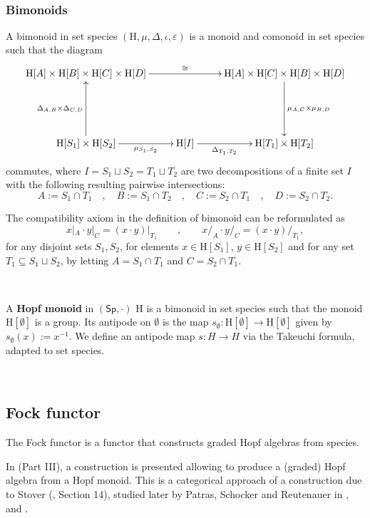 \documentclass[12pt, reqno]{amsart}
\theoremstyle{definition}
\newcommand{\Ss}{\mathsf{Sp}} %
\newcommand{\rH}{\mathrm{H}}
\begin{document}
\

\subsubsection{Bimonoids}
A bimonoid in set species $(\rH, \mu, \Delta, \iota, \varepsilon)$ is a monoid and comonoid in set species such that the diagram
\[\xymatrix{
\rH[A] \times \rH[B] \times\rH[C] \times \rH[D] \ar[rr]^-{\cong} && \rH[A] \times \rH[C] \times \rH[B] \times \rH[D] \ar[dd]^-{\mu_{A,C}\times\mu_{B,D}}\\
&&\\
\rH[S_1]\times \rH[S_2]\ar[uu]^-{\Delta_{A,B}\times \Delta_{C,D}} \ar[r]_-{\mu_{S_1, S_2}} & \rH[I] \ar[r]_-{\Delta_{T_1, T_2}} & \rH[T_1]\times \rH[T_2]
}\]
commutes, where $I=S_1\sqcup S_2=T_1 \sqcup T_2$ are two decompositions of a finite set $I$ with the following resulting pairwise intersections:
\[A:=S_1\cap T_1 \quad , \quad B:=S_1 \cap T_2 \quad , \quad C:=S_2 \cap T_1 \quad , \quad D:=S_2 \cap T_2.\]

The compatibility axiom in the definition of bimonoid can be reformulated as
\[x|_A \cdot y|_C= (x\cdot y)|_{T_1} \qquad , \qquad x/_A \cdot y/_C=(x \cdot y)/_{T_1},\]
for any disjoint sets $S_1, S_2$, for elements $x \in \rH[S_1]$, $y\in \rH[S_2]$ and for any set $T_1\subseteq S_1 \sqcup S_2$, by letting $A= S_1 \cap T_1$ and $C= S_2\cap T_1$.

\

A {\bf Hopf monoid} in $(\Ss, \cdot)$ $\rH$ is a bimonoid in set species such that the monoid $\rH[\emptyset]$ is a group.
Its antipode on $\emptyset $ is the map $s_\emptyset: \rH[\emptyset]\to \rH[\emptyset]$ given by $s_\emptyset(x):=x^{-1}$.
We define an antipode map $s: H\to H$ via the Takeuchi formula, adapted to set species.


\

\subsection{Fock functor}

The Fock functor is a functor that constructs graded Hopf algebras from species.

In \cite{AM2010} (Part III), a construction is presented allowing to produce a (graded) Hopf algebra from a Hopf monoid. This is a categorical approach of a construction due to Stover (\cite{Stover}, Section 14), studied later by Patras, Schocker and Reutenauer in \cite{PR2004}, \cite{PS2006} and \cite{PS2008}.
\end{document}
